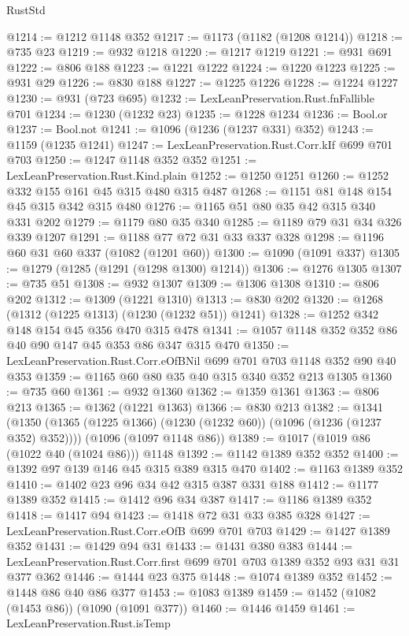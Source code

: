 \begin{lexlean}{RustStd}
\begin{coremodule}
@1214 := @1212 @1148 @352
@1217 := @1173 (@1182 (@1208 @1214))
@1218 := @735 @23
@1219 := @932 @1218
@1220 := @1217 @1219
@1221 := @931 @691
@1222 := @806 @188
@1223 := @1221 @1222
@1224 := @1220 @1223
@1225 := @931 @29
@1226 := @830 @188
@1227 := @1225 @1226
@1228 := @1224 @1227
@1230 := @931 (@723 @695)
@1232 := LexLeanPreservation.Rust.fnFallible @701
@1234 := @1230 (@1232 @23)
@1235 := @1228 @1234
@1236 := Bool.or
@1237 := Bool.not
@1241 := @1096 (@1236 (@1237 @331) @352)
@1243 := @1159 (@1235 @1241)
@1247 := LexLeanPreservation.Rust.Corr.kIf @699 @701 @703
@1250 := @1247 @1148 @352 @352
@1251 := LexLeanPreservation.Rust.Kind.plain
@1252 := @1250 @1251
@1260 := @1252 @332 @155 @161 @45 @315 @480 @315 @487
@1268 := @1151 @81 @148 @154 @45 @315 @342 @315 @480
@1276 := @1165 @51 @80 @35 @42 @315 @340 @331 @202
@1279 := @1179 @80 @35 @340
@1285 := @1189 @79 @31 @34 @326 @339 @1207
@1291 := @1188 @77 @72 @31 @33 @337 @328
@1298 := @1196 @60 @31 @60 @337 (@1082 (@1201 @60))
@1300 := @1090 (@1091 @337)
@1305 := @1279 (@1285 (@1291 (@1298 @1300) @1214))
@1306 := @1276 @1305
@1307 := @735 @51
@1308 := @932 @1307
@1309 := @1306 @1308
@1310 := @806 @202
@1312 := @1309 (@1221 @1310)
@1313 := @830 @202
@1320 := @1268 (@1312 (@1225 @1313) (@1230 (@1232 @51)) @1241)
@1328 := @1252 @342 @148 @154 @45 @356 @470 @315 @478
@1341 := @1057 @1148 @352 @352 @86 @40 @90 @147 @45 @353 @86 @347 @315 @470
@1350 := LexLeanPreservation.Rust.Corr.eOfBNil @699 @701 @703 @1148 @352 @90 @40 @353
@1359 := @1165 @60 @80 @35 @40 @315 @340 @352 @213 @1305
@1360 := @735 @60
@1361 := @932 @1360
@1362 := @1359 @1361
@1363 := @806 @213
@1365 := @1362 (@1221 @1363)
@1366 := @830 @213
@1382 := @1341
    (@1350 (@1365 (@1225 @1366) (@1230 (@1232 @60)) (@1096 (@1236 (@1237 @352) @352))))
    (@1096 (@1097 @1148 @86))
@1389 := @1017 (@1019 @86 (@1022 @40 (@1024 @86))) @1148
@1392 := @1142 @1389 @352 @352
@1400 := @1392 @97 @139 @146 @45 @315 @389 @315 @470
@1402 := @1163 @1389 @352
@1410 := @1402 @23 @96 @34 @42 @315 @387 @331 @188
@1412 := @1177 @1389 @352
@1415 := @1412 @96 @34 @387
@1417 := @1186 @1389 @352
@1418 := @1417 @94
@1423 := @1418 @72 @31 @33 @385 @328
@1427 := LexLeanPreservation.Rust.Corr.eOfB @699 @701 @703
@1429 := @1427 @1389 @352
@1431 := @1429 @94 @31
@1433 := @1431 @380 @383
@1444 := LexLeanPreservation.Rust.Corr.first @699 @701 @703 @1389 @352 @93 @31 @31 @377 @362
@1446 := @1444 @23 @375
@1448 := @1074 @1389 @352
@1452 := @1448 @86 @40 @86 @377
@1453 := @1083 @1389
@1459 := @1452 (@1082 (@1453 @86)) (@1090 (@1091 @377))
@1460 := @1446 @1459
@1461 := LexLeanPreservation.Rust.isTemp

\end{coremodule}
\end{lexlean}
